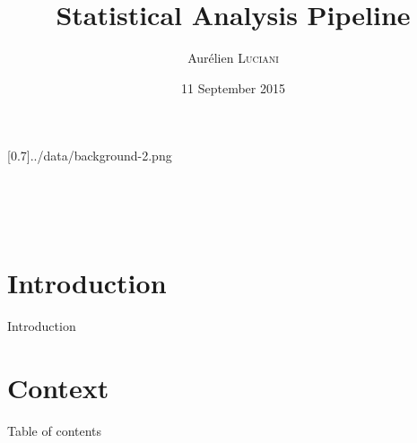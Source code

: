 \documentclass[10pt,aspectratio=43]{beamer}
\title{Statistical Analysis Pipeline}
\author{Aurélien \textsc{Luciani}}
\institute{Université de Bordeaux}
\date{11 September 2015}
\begin{document}
\masseyBrand{}[0.7]{../data/background-2.png}{}{}



\begin{frame}[t, noframenumbering]  %
\masseyTitlepage %

\raggedleft
\begin{mblock}[180pt]{0.7}{}
\raggedleft
\textbf{\insertauthor}\\
\insertdepartment\\
\insertinstitute\\
\insertdate
\end{mblock}
\vfill
\end{frame}


\section*{Introduction}
\masseyBrand{}{}{}{}
\begin{frame}{}{Introduction}
\end{frame}

\section{Context}
\begin{frame}{}{Table of contents}
\tableofcontents[currentsection, subsubsectionstyle=hide]
\end{frame}
\end{document}
